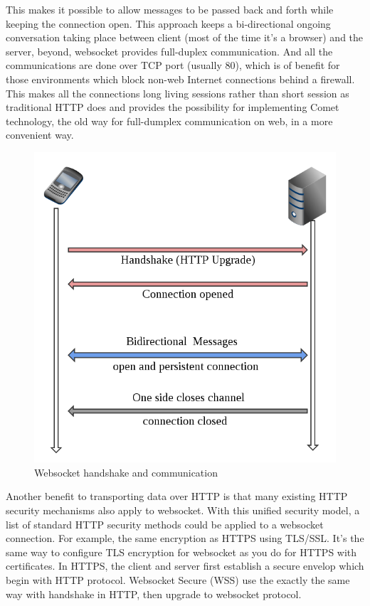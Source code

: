 \documentclass[numbers,numberedpars]{sigplanconf}
\begin{document}
This makes it possible to allow messages to be passed back and forth while keeping the connection open.
This approach keeps a bi-directional ongoing conversation taking place between client (most of the time it's a browser) and the server,
beyond, websocket provides full-duplex communication.
And all the communications are done over TCP port (usually 80), which is of benefit for those environments which block non-web Internet
connections behind a firewall. This makes all the connections long living sessions rather than short session as traditional HTTP does and
provides the possibility for implementing Comet technology, the old way for full-dumplex communication on web, in a more convenient way.

\begin{figure}[tbph]
  \centering
  \label{fig:websocket_connection}
  \includegraphics[scale=0.3]{websocket.png}
  \caption{Websocket handshake and communication}
\end{figure}

Another benefit to transporting data over HTTP is that many existing HTTP security mechanisms also apply to websocket.
With this unified security model, a list of standard HTTP security methods could be applied to a websocket connection.
For example, the same encryption as HTTPS using TLS/SSL. It's the same way to configure TLS encryption for websocket as you do for HTTPS with
certificates. In HTTPS, the client and server first establish a secure envelop which begin with HTTP protocol. Websocket Secure (WSS) use
the exactly the same way with handshake in HTTP, then upgrade to websocket protocol. 
\end{document}
